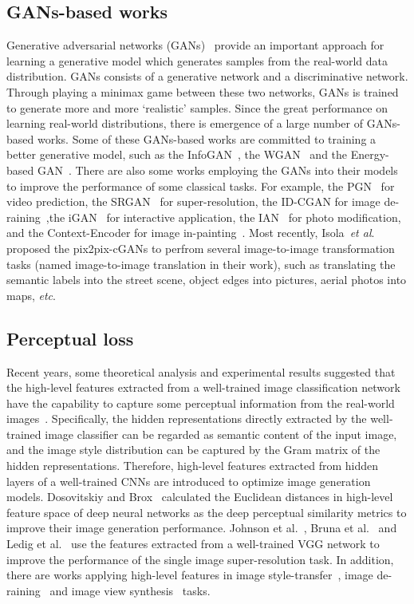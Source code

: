 \documentclass{article}
\newcommand{\etal}{\textit{et al}.}
\newcommand{\etc}{\textit{etc}}
\begin{document}
\subsection{GANs-based works}
Generative adversarial networks (GANs)~\cite{goodfellow2014generative} provide an important approach for learning a generative model which generates samples from the real-world data distribution. GANs consists of a generative network and a discriminative network. Through playing a minimax game between these two networks, GANs is trained to generate more and more `realistic' samples. Since the great performance on learning real-world distributions, there is emergence of a large number of GANs-based works. Some of these GANs-based works are committed to training a better generative model, such as the InfoGAN~\cite{chen2016infogan}, the WGAN~\cite{arjovsky2017wasserstein} and the Energy-based GAN~\cite{zhao2016energy}. There are also some works employing the GANs into their models to improve the performance of some classical tasks. For example, the PGN~\cite{lotter2015unsupervised} for video prediction, the SRGAN~\cite{ledig2016photo} for super-resolution, the ID-CGAN for image de-raining~\cite{zhang2017image},the iGAN~\cite{zhu2016generative} for interactive application, the IAN~\cite{brock2016neural} for photo modification, and the Context-Encoder for image in-painting~\cite{pathak2016context}. 
Most recently, Isola~\etal~\cite{isola2016image} proposed the pix2pix-cGANs to perfrom several image-to-image transformation tasks (named image-to-image translation in their work), such as translating the semantic labels into the street scene, object edges into pictures, aerial photos into maps, \etc.

\subsection{Perceptual loss}
Recent years, some theoretical analysis and experimental results suggested that the high-level features extracted from a well-trained image classification network have the capability to capture some perceptual information from the real-world images~\cite{gatys2015neural,johnson2016perceptual}. Specifically, the hidden representations directly extracted by the well-trained image classifier can be regarded as semantic content of the input image, and the image style distribution can be captured by the Gram matrix of the hidden representations. Therefore, high-level features extracted from hidden layers of a well-trained CNNs are introduced to optimize image generation models. Dosovitskiy and Brox~\cite{dosovitskiy2016generating} calculated the Euclidean distances in high-level feature space of deep neural networks as the deep perceptual similarity metrics to improve their image generation performance. Johnson et al.~\cite{johnson2016perceptual}, Bruna
et al.~\cite{bruna2015super} and Ledig et al.~\cite{ledig2016photo} use the features extracted from a
well-trained VGG network to improve the performance of the single image super-resolution task. In addition, there are works applying high-level features in image style-transfer~\cite{gatys2015neural, johnson2016perceptual}, image de-raining~\cite{zhang2017image} and image view synthesis~\cite{park2017transformation} tasks.
\end{document}
